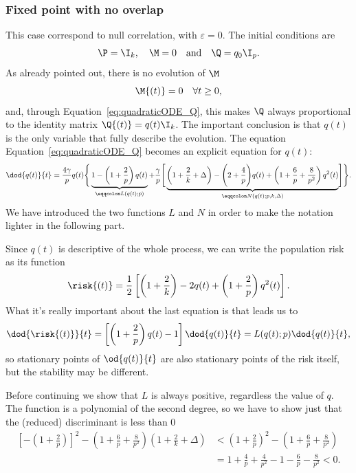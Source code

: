 \subsubsection{Fixed point with no overlap}
This case correspond to null correlation, with \(\varepsilon=0\).
The initial conditions are 
\[\P = \I_k, \quad \M = 0 \quad \text{and}\quad \Q = q_0 \I_p.\]
As already pointed out, there is no evolution of \(\M\)
\[\M{(t)} = 0\quad \forall t\ge0,\]
and, through Equation~\eqref{eq:quadraticODE_Q},
this makes \(\Q\) always proportional to the identity matrix \(\Q{(t)} = q{(t)} \I_k\).
The important conclusion is that \(q(t)\) is the only variable that fully describe the evolution.
The equation Equation~\eqref{eq:quadraticODE_Q} becomes an explicit equation for \(q{(t)}\):
\begin{equation}\label{eq:eps0ODEforq}\begin{split}
    \dod{q{(t)}}{t} = \frac{4\gamma}{p}q{(t)}\Biggr\{\underbrace{
        1 - \left(1+\frac2p\right) q{(t)}}_{\eqqcolon L{(q{(t)};p)}}
    +\frac{\gamma}{p} \Biggr[\underbrace{
        \left(1+\frac2k+\Delta\right) - \Biggl(2 + \frac4p \Biggl)q{(t)} +
        \left(1+\frac6p+\frac{8}{p^2}\right)q^2{(t)}}_{\eqqcolon N{(q{(t)};p,k,\Delta)}}
    \Biggr]\Biggr\}.
\end{split}\end{equation}
We have introduced the two functions \(L\) and \(N\) in order to make the notation
lighter in the following part.

Since \(q(t)\) is descriptive of the whole process, we can write the population risk as its function
\[
  \risk{(t)} = \frac12\left[\left(1+\frac2k\right)-2q{(t)}+\left(1+\frac2p\right)q^2{(t)}\right].
\]
What it's really important about the last equation is that leads us to
\[
    \dod{\risk{(t)}}{t} = \left[\left(1+\frac2p\right)q{(t)}-1\right] \dod{q{(t)}}{t} = L{(q{(t)};p)} \dod{q{(t)}}{t},
\]
so stationary points of \(\od{q{(t)}}{t}\) are also stationary points of the risk itself, but the stability may be different.

Before continuing we show that \(L\) is always positive, regardless the value of \(q\).
The function is a polynomial of the second degree,
so we have to show just that the (reduced) discriminant is less than 0
\[\begin{split}
  \left[-\left(1 + \frac2p \right)\right]^2 - \left(1+\frac6p+\frac{8}{p^2}\right)\left(1+\frac2k+\Delta\right) &<
  \left(1 + \frac2p \right)^2 - \left(1+\frac6p+\frac{8}{p^2}\right) \\
  &= 1 + \frac4p + \frac{4}{p^2} - 1-\frac6p-\frac{8}{p^2} 
  <0.
\end{split}\]

